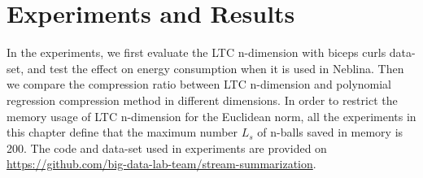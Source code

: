 \chapter{Experiments and Results}
\label{chap:expsAndResults}
In the experiments, we first evaluate the LTC n-dimension with biceps curls
data-set, and test the effect on energy consumption when it is used in Neblina.
Then we compare the compression ratio between LTC n-dimension and polynomial
regression compression method in different dimensions. In order to restrict the
memory usage of LTC n-dimension for the Euclidean norm, all the experiments in this
chapter define that the maximum number $L_s$ of n-balls saved in memory is 200.
The code and data-set used in experiments are provided on
\url{https://github.com/big-data-lab-team/stream-summarization}. 





